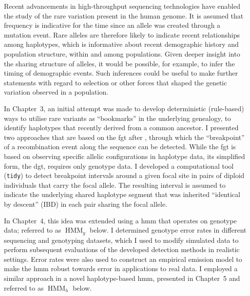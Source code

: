 Recent advancements in high-throughput sequencing technologies have enabled the study of the rare variation present in the human genome.
It is assumed that frequency is indicative for the time since an allele was created through a mutation event.
Rare alleles are therefore likely to indicate recent relationships among haplotypes, which is informative about recent demographic history and population structure, within and among populations.
Given deeper insight into the sharing structure of alleles, it would be possible, for example, to infer the timing of demographic events.
Such inferences could be useful to make further statements with regard to selection or other forces that shaped the genetic variation observed in a population.

In Chapter~3, an initial attempt was made to develop deterministic (rule-based) ways to utilise rare variants as ``bookmarks'' in the underlying genealogy, to identify haplotypes that recently derived from a common ancestor.
I presented two approaches that are based on the \gls{fgt} after \citet{Hudson:1985wh}, through which the ``breakpoint'' of a recombination event along the sequence can be detected.
While the \gls{fgt} is based on observing specific allelic configurations in haplotype data, its simplified form, the \gls{dgt}, requires only genotype data.
I developed a computational tool (\texttt{tidy}) to detect breakpoint intervals around a given focal site in pairs of diploid individuals that carry the focal allele.
The resulting interval is assumed to indicate the underlying shared haplotype segment that was inherited ``identical by descent'' (IBD) in each pair sharing the focal allele.

In Chapter~4, this idea was extended using a \gls{hmm} that operates on genotype data; referred to as $\operatorname{HMM}_g$ below.
I determined genotype error rates in different sequencing and genotyping datasets, which I used to modify simulated data to perform subsequent evaluations of the developed detection methods in realistic settings.
Error rates were also used to construct an empirical emission model to make the \gls{hmm} robust towards error in applications to real data.
I employed a similar approach in a novel haplotype-based \gls{hmm}, presented in Chapter~5 and referred to as $\operatorname{HMM}_h$ below.

